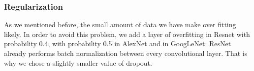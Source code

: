 \subsubsection{Regularization}
As we mentioned before, the small amount of data we have make over fitting likely. In order to avoid this problem, we add a layer of overfitting in Resnet with probability 0.4, with probability 0.5 in AlexNet and in GoogLeNet. ResNet already performs batch normalization between every convolutional layer. That is why we chose a slightly smaller value of dropout. 